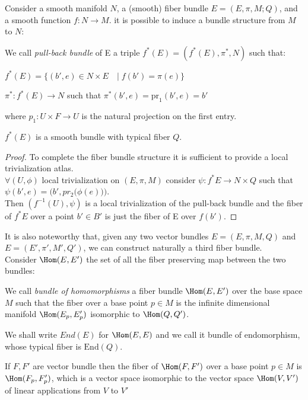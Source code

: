 \documentclass[Main]{subfiles}
\begin{document}
			\vspace{3mm}	
			Consider a smooth manifold $N$, a (smooth) fiber bundle $E=(E,\pi,M;Q)$, and a smooth function $f: N \rightarrow M$. it is possible to induce\cite{Husemoller} a bundle structure from $M$ to $N$:
			\begin{definition}
				We call \emph{pull-back bundle} of E a triple $f^* (E) = (f^* (E) , \pi^*,N)$ such that:
				\begin{compactitemize}
					\item $f^* (E) =  \big\{ (b',e) \in N \times E \quad \big\vert \; f(b') = \pi(e) \big\} $
					\item $\pi^*:f^* (E) \rightarrow N $ such that $ \pi^* (b',e) = \textrm{pr}_1 (b',e)= b' $
				\end{compactitemize}
				where $p_1 : U \times F \rightarrow U$ is the natural projection  on the first entry.
			\end{definition}
			\begin{proposition}
				$f^* (E)$ is a smooth bundle with typical fiber $Q$.
			\end{proposition}
			\begin{proof}
				To complete the fiber bundle structure it is sufficient to provide a local trivialization atlas.
				\\
				$\forall ( U, \phi)$ local trivialization on $(E, \pi, M)$  consider $\psi: f^* E \rightarrow N \times Q$ such that $\psi( b',e) = \bigg( b', pr_2 \big( \phi(e)\big)\bigg)$.
				\\
				Then $(f^{-1}(U),\psi)$ is a local trivialization of the pull-back bundle and the fiber of $f^*E$ over a point $b'\in B'$  is just the fiber of E over $f(b')$.
			\end{proof}

			
			It is also noteworthy that, given any two vector bundles $E =(E,\pi,M,Q)$ and $E =(E',\pi',M',Q')$, we can construct 	naturally a third fiber bundle.\\
			Consider $\Hom(E,E')$ the set of all the fiber preserving map between the two bundles:
			\begin{definition}
				We call \emph{bundle of homomorphisms} a fiber bundle $\Hom(E,E')$ over the base space $M$ such that the fiber over a base point $p\in M$ is the infinite dimensional manifold $\Hom(E_p,E'_p)$ isomorphic to $\Hom(Q,Q')$.
			\end{definition}
				We shall write $End(E)$ for $\Hom(E,E)$ and we call it bundle of endomorphism, whose typical fiber is $\textrm{End}(Q)$.
			\begin{remark}
				If $F,F'$ are vector bundle then the fiber of  $\Hom(F,F')$ over a base point $p\in M$ is $\Hom(F_p,F'_p)$, which is a vector space isomorphic to the vector space $\Hom(V,V')$ of linear applications from $V$ to $V'$
			\end{remark}
	
\end{document}
